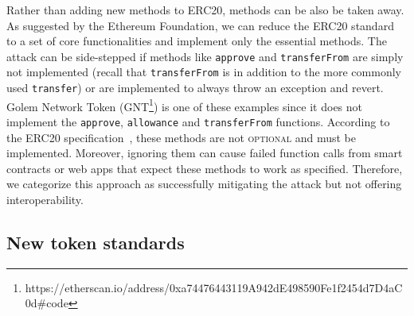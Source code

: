 Rather than adding new methods to ERC20, methods can be also be taken away. As suggested by the Ethereum Foundation\cite{Ref05}, we can reduce the ERC20 standard to a set of core functionalities and implement only the essential methods. The attack can be side-stepped if methods like \texttt{approve} and \texttt{transferFrom} are simply not implemented (recall that \texttt{transferFrom} is in addition to the more commonly used \texttt{transfer}) or are implemented to always throw an exception and revert. Golem Network Token (GNT\footnote{https://etherscan.io/address/0xa74476443119A942dE498590Fe1f2454d7\newline D4aC0d\#code}) is one of these examples since it does not implement the \texttt{approve}, \texttt{allowance} and \texttt{transferFrom} functions. According to the ERC20 specification~\cite{Ref08}, these methods are not \textsc{optional} and must be implemented. Moreover, ignoring them can cause failed function calls from smart contracts or web apps that expect these methods to work as specified. Therefore, we categorize this approach as successfully mitigating the attack but not offering interoperability.


\subsection{New token standards}


